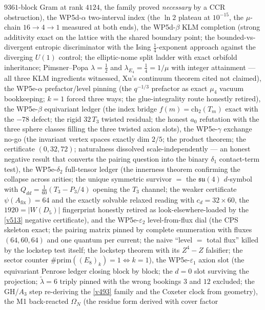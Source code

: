 \documentclass[11pt,a4paper]{article}
\begin{document}
$9361$-block Gram at rank $4124$, the family proved \emph{necessary} by a CCR obstruction), the
WP5d-$\alpha$ two-interval index (the $\ln2$ plateau at $10^{-15}$, the $\mu$-chain $16\to4\to1$
measured at both ends), the WP5d-$\beta$ KLM completion (strong additivity exact on the lattice
with the shared boundary point; the bounded-vs-divergent entropic discriminator with the Ising
$\tfrac14$-exponent approach against the diverging $U(1)$ control; the elliptic-nome split ladder
with exact orbifold inheritance; Pimsner--Popa $\lambda=\tfrac12$ and $\lambda_{E_4}=\tfrac14=1/\mu$
with integer attainment --- all three KLM ingredients witnessed, Xu's continuum theorem cited not
claimed), the WP5e-$\alpha$ prefactor/level pinning (the $q^{-1/3}$ prefactor as
exact $\mu_4$ vacuum bookkeeping; $k=1$ forced three ways; the glue-integrality route honestly
retired), the WP5e-$\beta$ equivariant ledger (the index bridge $f(m)=\mathrm{ch}_2(T_m)$
exact with the $-78$ defect; the rigid $32\,T_3$ twisted residual; the honest $a_0$ refutation
with the three sphere classes filling the three twisted axion slots), the WP5e-$\gamma$
exchange no-go (the invariant vertex spaces exactly dim $2/5$; the product theorem; the
certificate $(0,32,72)$; naturalness dissolved scale-independently --- an honest negative result
that converts the pairing question into the binary $\delta_1$ contact-term test), the
WP5e-$\delta_2$ full-tensor ledger (the innerness theorem confirming the collapse across arities;
the unique symmetric survivor $=$ the $\mathfrak{su}(4)$ $d$-symbol with
$Q_{dd}=\tfrac1{60}(T_3-P_3/4)$ opening the $T_3$ channel; the weaker certificate
$\psi(A_{\mathrm{fix}})=64$ and the exactly solvable relaxed reading with
$c_d=32\times60$, the $1920=|W(D_5)|$ fingerprint honestly retired as look-elsewhere-loaded by
the \vref{v513} negative certificate), and the
WP5e-$\varepsilon_2$ level-from-flux dial (the CPS skeleton exact; the pairing matrix pinned by
complete enumeration with fluxes $(64,60,64)$ and one quantum per current; the naive ``level $=$
total flux'' killed by the lockstep test itself; the lockstep theorem with its $Z^4{-}Z$
falsifier; the sector counter $\#\mathrm{prim}((E_8)_k)=1\Leftrightarrow k=1$), the
WP5e-$\varepsilon_1$ axion slot (the equivariant Penrose ledger closing block by block; the
$d=0$ slot surviving the projection; $\tilde\lambda=6$ triply pinned with the wrong bookings $3$
and $12$ excluded; the GH/$A_3$ step re-deriving the \vref{v493} family and the Coxeter clock
from geometry), the M1 back-reacted $\Omega_N$ (the residue form derived with cover factor
\end{document}
